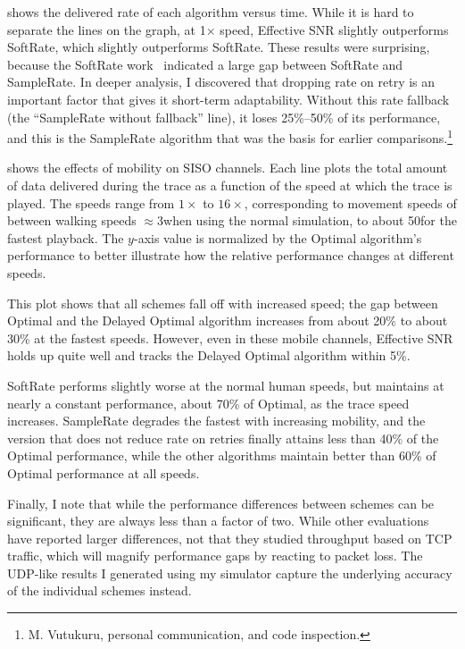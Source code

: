  shows the delivered rate of each algorithm versus time. While it is hard to separate the lines on the graph, at 1$\times$ speed, Effective SNR slightly outperforms SoftRate, which slightly outperforms SoftRate. These results were surprising, because the SoftRate work~\cite{Vutukuru_SoftRate} indicated a large gap between SoftRate and SampleRate. In deeper analysis, I discovered that dropping rate on retry is an important factor that gives it short-term adaptability. Without this rate fallback (the ``SampleRate without fallback'' line), it loses 25\%--50\% of its performance, and this is the SampleRate algorithm that was the basis for earlier comparisons.\footnote{M. Vutukuru, personal communication, and code inspection.}

 shows the effects of mobility on SISO channels. Each line plots the total amount of data delivered during the trace as a function of the speed at which the trace is played. The speeds range from $1\times$ to $16\times$, corresponding to movement speeds of between walking speeds $\approx$3\mph when using the normal simulation, to about 50\mph for the fastest playback. The $y$-axis value is normalized by the Optimal algorithm's performance to better illustrate how the relative performance changes at different speeds.

This plot shows that all schemes fall off with increased speed; the gap between Optimal and the Delayed Optimal algorithm increases from about 20\% to about 30\% at the fastest speeds. However, even in these mobile channels, Effective SNR holds up quite well and tracks the Delayed Optimal algorithm within 5\%.

SoftRate performs slightly worse at the normal human speeds, but maintains at nearly a constant performance, about 70\% of Optimal, as the trace speed increases. SampleRate degrades the fastest with increasing mobility, and the version that does not reduce rate on retries finally attains less than 40\% of the Optimal performance, while the other algorithms maintain better than 60\% of Optimal performance at all speeds.

Finally, I note that while the performance differences between schemes can be significant, they are always less than a factor of two. While other evaluations have reported larger differences, not that they studied throughput based on TCP traffic, which will magnify performance gaps by reacting to packet loss. The UDP-like results I generated using my simulator capture the underlying accuracy of the individual schemes instead.


